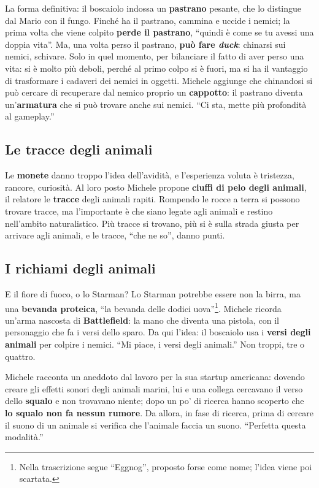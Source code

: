 La forma definitiva: il boscaiolo indossa un \textbf{pastrano} pesante, che lo
distingue dal Mario con il fungo. Finché ha il pastrano, cammina e uccide i nemici;
la prima volta che viene colpito \textbf{perde il pastrano}, ``quindi è come se tu
avessi una doppia vita''. Ma, una volta perso il pastrano, \textbf{può fare
\emph{duck}}: chinarsi sui nemici, schivare. Solo in quel momento, per bilanciare
il fatto di aver perso una vita: si è molto più deboli, perché al primo colpo si è
fuori, ma si ha il vantaggio di trasformare i cadaveri dei nemici in oggetti.
Michele aggiunge che chinandosi si può cercare di recuperare dal nemico proprio un
\textbf{cappotto}: il pastrano diventa un'\textbf{armatura} che si può trovare
anche sui nemici. ``Ci sta, mette più profondità al gameplay.''

\subsection{Le tracce degli animali}

Le \textbf{monete} danno troppo l'idea dell'avidità, e l'esperienza voluta è
tristezza, rancore, curiosità. Al loro posto Michele propone \textbf{ciuffi di pelo
degli animali}, il relatore le \textbf{tracce} degli animali rapiti. Rompendo le
rocce a terra si possono trovare tracce, ma l'importante è che siano legate agli
animali e restino nell'ambito naturalistico. Più tracce si trovano, più si è sulla
strada giusta per arrivare agli animali, e le tracce, ``che ne so'', danno punti.

\subsection{I richiami degli animali}

E il fiore di fuoco, o lo Starman? Lo Starman potrebbe essere non la birra, ma una
\textbf{bevanda proteica}, ``la bevanda delle dodici uova''\footnote{Nella
trascrizione segue ``Eggnog'', proposto forse come nome; l'idea viene poi
scartata.}. Michele ricorda un'arma nascosta di \textbf{Battlefield}: la mano che
diventa una pistola, con il personaggio che fa i versi dello sparo. Da qui l'idea: il
boscaiolo usa i \textbf{versi degli animali} per colpire i nemici. ``Mi piace, i
versi degli animali.'' Non troppi, tre o quattro.

Michele racconta un aneddoto dal lavoro per la sua startup americana: dovendo
creare gli effetti sonori degli animali marini, lui e una collega cercavano il verso
dello \textbf{squalo} e non trovavano niente; dopo un po' di ricerca hanno scoperto
che \textbf{lo squalo non fa nessun rumore}. Da allora, in fase di ricerca, prima di
cercare il suono di un animale si verifica che l'animale faccia un suono.
``Perfetta questa modalità.''

